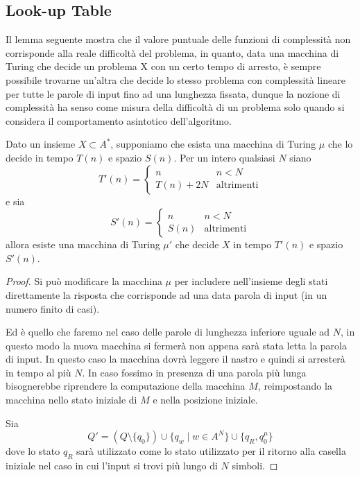 \subsection{Look-up Table}
Il lemma seguente mostra che il valore puntuale delle funzioni di complessità non corrisponde alla reale
diﬀicoltà del problema, in quanto, data una macchina di Turing che decide un problema X con un certo
tempo di arresto, è sempre possibile trovarne un’altra che decide lo stesso problema con complessità lineare
per tutte le parole di input fino ad una lunghezza fissata, dunque la nozione di complessità ha senso come
misura della diﬀicoltà di un problema solo quando si considera il comportamento asintotico dell’algoritmo.
\begin{lemm}
Dato un insieme $X \subset A^*$, supponiamo che esista una macchina di Turing $\mu$ che lo decide in tempo $T(n)$ e spazio $S(n)$.
Per un intero qualsiasi $N$ siano
\[
T'(n) =
\begin{cases}
n & n < N \\[4pt]
T(n) + 2N & \text{altrimenti}
\end{cases}
\]
e sia
\[
S'(n) =
\begin{cases}
n & n < N \\[4pt]
S(n) & \text{altrimenti}
\end{cases}
\]
allora esiste una macchina di Turing $\mu'$ che decide $X$ in tempo $T'(n)$ e spazio $S'(n)$.

\begin{proof}
Si può modificare la macchina $\mu$ per includere nell'insieme degli stati direttamente la risposta che corrisponde ad una data parola di input (in un numero finito di casi).

Ed è quello che faremo nel caso delle parole di lunghezza inferiore uguale ad $N$, in questo modo la nuova macchina si fermerà non appena sarà stata letta la parola di input. In questo caso la macchina dovrà leggere il nastro e quindi si arresterà in tempo al più $N$. In caso fossimo in presenza di una parola più lunga bisognerebbe riprendere la computazione della macchina $M$, reimpostando la macchina nello stato iniziale di $M$ e nella posizione iniziale.

Sia
\[
Q' = (Q\setminus \{ q_0\}) \cup \{q_w \mid w \in A^N\} \cup \{q_R, q_0^\mu\}
\]
dove lo stato $q_R$ sarà utilizzato come lo stato utilizzato per il ritorno alla casella iniziale nel caso in cui l'input si trovi più lungo di $N$ simboli.


\end{proof}
\end{lemm}
